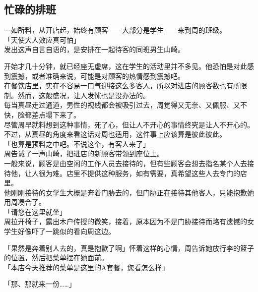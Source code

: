 \subsection{忙碌的排班}

一如所料，从开店起，始终有顾客——大部分是学生——来到周的班级。\\

「天使大人效应真可怕」\\

发出这声自言自语的，是安排在一起待客的同班男生山崎。

开始才几十分钟，就已经座无虚席，这在学生的活动里并不多见。他恐怕是对此感到震撼，或者准确来说，可能是对顾客的热情感到震撼吧。\\

在餐饮店里，实在不容易一口气迎接这么多客人，所以对进店的顾客数也有所限制。然而，这般盛况，让人发怵也是没办法的。\\

每当真昼走过通道，男性的视线都会被吸引过去，周觉得又无奈、又佩服、又不快，脸都差点塌下来了。\\

尽管周早就料想到这种事情，死了心，但让人不开心的事情终究是让人不开心的。不过，从真昼的角度来看这话对周也适用，这件事上应该算是彼此彼此。\\

「也算是预料之中吧。不说这个，有客人来了」\\

周告诫了一声山崎，把进店的新顾客带领到座位上。\\

一般来说，顾客是由空闲的工作人员去接待的，但有些顾客会想去指名某个人去接待他，让人很为难。店里不提供这种服务，如有需要，真希望这些人去专门的店里。\\

他刚刚接待的女学生大概是奔着门胁去的，但门胁正在接待其他客人，只能抱歉她用周凑合了。\\

「请您在这里就坐」\\

周拉开椅子，露出木户传授的微笑，接着，原本因为不是门胁接待而略有遗憾的女学生好像吓了一跳似的看向周这边。

「果然是奔着别人去的，真是抱歉了啊」怀着这样的心情，周告诉她放行李的篮子的位置，然后把菜单摆在她面前。\\

「本店今天推荐的菜单是这里的A套餐，您看怎么样」

「那、那就来一份……」\\

